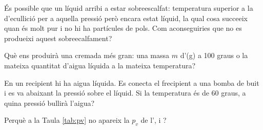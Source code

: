 \begin{exr}{}
És possible que un líquid arribi a estar sobreescalfat: temperatura superior a la d'ecullició per a aquella pressió però encara estat líquid, la qual cosa succeeix quan és molt pur i no hi ha partícules de pols.
Com aconseguiries que no es produeixi aquest sobreecalfament?
\end{exr} 
\begin{exr}{}
    Què ens produirà una cremada més gran: una massa $m$ d'(g) a 100 graus o la mateixa quantitat d'aigua líquida a la mateixa temperatura?
    \end{exr}
    
    \begin{exr}{}
    En un recipient hi ha aigua líquida. Es conecta el frecipient a una bomba de buit i es va abaixant la pressió sobre el líquid. Si la temperatura és de 60 graus, a quina pressió bullirà l'aigua?
    \end{exr}
    
    \begin{exr}{}
    Perquè a la Taula \ref{tab:pv} no apareix la $p_v$ de l',  i ?
    \end{exr}
